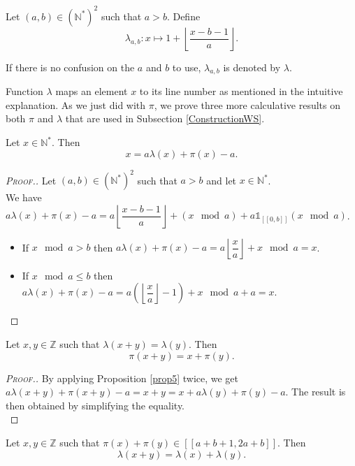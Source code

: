 \begin{definition}
Let \((a,b) \in (\mathbb{N}^*)^2\) such that \(a>b\). Define
\[ \lambda_{a,b}:x \longmapsto 1+ \left\lfloor\dfrac{x-b-1}{a}\right\rfloor.\]
\end{definition}

If there is no confusion on the \(a\) and \(b\) to use, \(\lambda_{a, b}\) is denoted by \(\lambda\).

Function \(\lambda\) maps an element \(x\) to its line number as mentioned in the intuitive explanation.
As we just did with \(\pi\), we prove three more calculative results on both \(\pi\) and \(\lambda\) that are used in
Subsection \ref{ConstructionWS}.

\begin{proposition}
\label{prop5}
Let \(x\in \mathbb{N}^*\). Then
\[
x=a\lambda(x)+\pi(x)-a.
\]
\end{proposition}

\begin{proof}[\textsc{Proof.}]
Let \((a,b)\in (\mathbb{N}^*)^2\) such that \(a>b\) and let \(x\in \mathbb{N}^*\). \\
We have \(a\lambda(x)+\pi(x)-a=a\left\lfloor\dfrac{x-b-1}{a}\right\rfloor+(x \mod a)+ a \mathds{1}_{ [\![0,b]\!]}(x \mod a)\).

\begin{itemize}
\item If \(x \mod a>b\) then \(a\lambda(x)+\pi(x)-a=a\left\lfloor\dfrac{x}{a}\right\rfloor+x \mod a=x\).
\item If \(x \mod a \leqslant b\) then \(a\lambda(x)+\pi(x)-a=a \left( \left \lfloor \dfrac{x}{a} \right \rfloor - 1 \right)+x \mod a +a=x\).
\end{itemize}
\end{proof}

\begin{proposition}
\label{prop6}
Let \(x, y \in \mathbb{Z}\) such that \(\lambda(x + y) = \lambda(y)\). Then
\[
\pi(x + y) = x + \pi(y).
\]
\end{proposition}

\begin{proof}[\textsc{Proof.}]
By applying Proposition \ref{prop5} twice, we get \(a \lambda(x + y) + \pi(x + y) - a = x + y = x + a \lambda(y) + \pi(y) - a\).
The result is then obtained by simplifying the equality. \\
\end{proof}

\begin{proposition}
\label{prop7}
Let \(x, y \in \mathbb{Z}\) such that \(\pi(x) + \pi(y) \in [\![a + b + 1, 2 a + b]\!]\). Then
\[
\lambda(x + y) = \lambda(x) + \lambda(y).
\]
\end{proposition}

